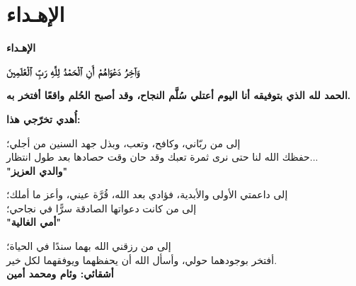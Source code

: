 \chapter*{\textarabic{الإهـداء}} 
\vspace{-4.05cm}
\begin{center}
	{\Huge \textbf{\textarabic{الإهـداء}}}
	\vspace{1cm}
\end{center}
{\setmainfont{Times New Roman}
	\vspace{-1cm}
	\begin{center}
		\begin{tcolorbox}[colback=gray!10, colframe=gray!30, boxrule=1pt, arc=3mm, width=0.8\textwidth]
			\centering
			\textarabic{\quranfont \Large \textbf{وَآخِرُ دَعْوَاهُمْ أَنِ ٱلْحَمْدُ لِلَّهِ رَبِّ ٱلْعَٰلَمِينَ}}
		\end{tcolorbox}
	\end{center}
	\begin{center}
		\textarabic{\large \textbf{الحمد لله الذي بتوفيقه أنا اليوم أعتلي سُلَّم النجاح، وقد أصبح الحُلم واقعًا أفتخر به.}}
	\end{center}
	\vspace{-0.6cm}
	\begin{center}
		\textarabic{\Large \textbf{أُهدي تخرّجي هذا:}}
		
		
		\textarabic{إلى من ربّاني، وكافح، وتعب، وبذل جهد السنين من أجلي؛}\\
		\textarabic{حفظك الله لنا حتى نرى ثمرة تعبك وقد حان وقت حصادها بعد طول انتظار...}\\
		\textarabic{\textbf{ "والدي العزيز"}}
		
		\vspace{0.2cm}
		
		\textarabic{إلى داعمتي الأولى والأبدية، فؤادي بعد الله، قُرَّة عيني، وأعز ما أملك؛}\\
		\textarabic{إلى من كانت دعواتها الصادقة سرًّا في نجاحي؛}\\
		\textarabic{\textbf{ "أمي الغالية"}}
		
		\vspace{0.2cm}
		\textarabic{إلى من رزقني الله بهما سندًا في الحياة؛}\\
		\textarabic{أفتخر بوجودهما حولي، وأسأل الله أن يحفظهما ويوفقهما لكل خير.}\\
		\textarabic{\textbf{ أشقائي: وئام ومحمد أمين}}
		

\end{center}}
